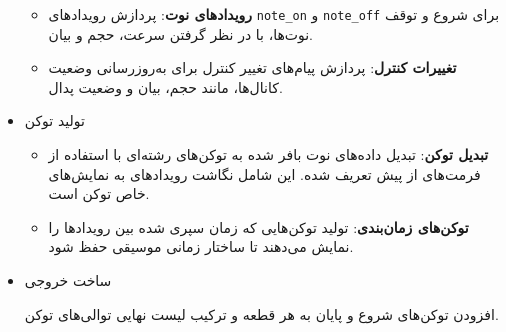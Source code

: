 \begin{itemize}
\begin{itemize}
                  \item
                        \textbf{رویدادهای نوت}: پردازش رویدادهای \texttt{note\_on} و
                        \texttt{note\_off} برای شروع و توقف نوت‌ها، با در نظر گرفتن سرعت، حجم و
                        بیان.
                  \item
                        \textbf{تغییرات کنترل}: پردازش پیام‌های تغییر کنترل برای به‌روزرسانی
                        وضعیت کانال‌ها، مانند حجم، بیان و وضعیت پدال.
            \end{itemize}

      \item    {تولید توکن}

            \begin{itemize}

                  \item
                        \textbf{تبدیل توکن}: تبدیل داده‌های نوت بافر شده به توکن‌های رشته‌ای با
                        استفاده از فرمت‌های از پیش تعریف شده. این شامل نگاشت رویدادهای  به
                        نمایش‌های خاص توکن است.
                  \item
                        \textbf{توکن‌های زمان‌بندی}: تولید توکن‌هایی که زمان سپری شده بین
                        رویدادها را نمایش می‌دهند تا ساختار زمانی موسیقی حفظ شود.
            \end{itemize}

      \item {ساخت خروجی}

            افزودن توکن‌های شروع و پایان به هر قطعه و ترکیب
            لیست نهایی توالی‌های توکن.


\end{itemize}


